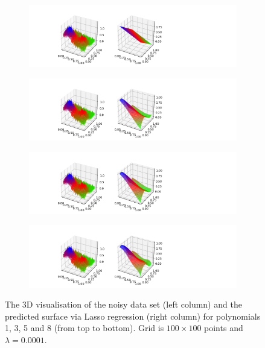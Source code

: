 \begin{figure}[!ht]
\begin{subfigure}{\textwidth}
  \centering
  \includegraphics[width=1\linewidth]{images/surf/fake_lasso_p01_n100.png}
\end{subfigure}
\begin{subfigure}{\textwidth}
  \centering
  \includegraphics[width=1\linewidth]{images/surf/fake_lasso_p03_n100.png}
\end{subfigure}
\begin{subfigure}{\textwidth}
  \centering
  \includegraphics[width=1\linewidth]{images/surf/fake_lasso_p05_n100.png}
\end{subfigure}
\begin{subfigure}{\textwidth}
  \centering
  \includegraphics[width=1\linewidth]{images/surf/fake_lasso_p08_n100.png}
\end{subfigure}
\caption{The 3D visualisation of the noisy data set (left column) and the predicted surface via Lasso regression (right column) for polynomials 1, 3, 5 and 8 (from top to bottom). Grid is $100\times100$ points and $\lambda = 0.0001$.}
\label{fig:lasso-surf2}
\end{figure}

